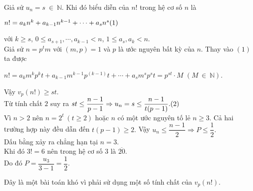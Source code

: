 \begin{bt}
{Giả sử $u_n=s \ \in \ \mathbb{N}.$ Khi đó biểu diễn của $n!$ trong hệ cơ số $n$ là
\begin{center}
$n!=a_kn^k+a_{k-1}n^{k-1}+\cdots+a_sn^s \hfill (1)$
\end{center}
với $k\geq s$, $0\leq a_{s+1},\cdots,a_{k-1}<n$, $1\leq a_s,a_k<n.$\\
Giả sử $n=p^tm$ với $(m,p)=1$ và $p$ là ước nguyên bất kỳ của $n$. Thay vào $(1)$ ta được
\begin{center}
$n!=a_km^kp^kt+a_{k-1}m^{k-1}p^(k-1)t+\cdots+a_sm^sp^st=p^{st}\cdot M$ $(M \ \in \ \mathbb{N}).$
\end{center}
Vậy $v_p(n!)\geq st.$\\
Từ tính chất $2$ suy ra $st\leq \dfrac{n-1}{p-1} \Rightarrow u_n=s\leq \dfrac{n-1}{t(p-1)}. \hfill (2) $\\
Vì $n>2$ nên $n=2^t \ (t\geq2)$ hoặc $n$ có một ước nguyên tố lẻ $n\geq3.$ Cả hai trường hợp này đều dẫn đến $t(p-1)\geq2.$ Vậy $u_n\leq\dfrac{n-1}{2}\Rightarrow P\leq\dfrac{1}{2}.$\\
Dấu bằng xảy ra chẳng hạn tại $n=3.$\\
Khi đó $3!=6$ nên trong hệ cơ số $3$ là $\overline{20}.$\\
Do đó $P=\dfrac{u_3}{3-1}=\dfrac{1}{2}.$\\

\begin{nx}
Đây là một bài toán khó vì phải sử dụng một số tính chất của $v_p(n!).$
\end{nx}
}
\end{bt}
